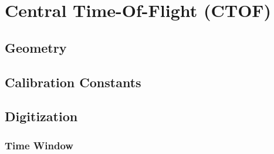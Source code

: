\section{Central Time-Of-Flight (CTOF)}


\subsection{Geometry}

\subsection{Calibration Constants}


\subsection{Digitization}

\subsubsection{Time Window}

